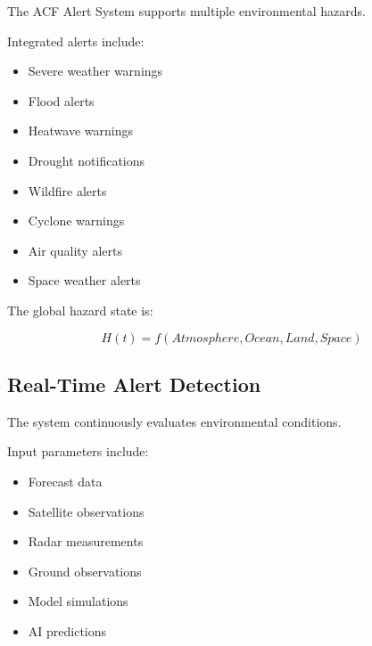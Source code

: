 The ACF Alert System supports multiple environmental hazards.

Integrated alerts include:

\begin{itemize}

\item Severe weather warnings

\item Flood alerts

\item Heatwave warnings

\item Drought notifications

\item Wildfire alerts

\item Cyclone warnings

\item Air quality alerts

\item Space weather alerts

\end{itemize}


The global hazard state is:

\[
H(t)=
f(Atmosphere,Ocean,Land,Space)
\]



\subsection{Real-Time Alert Detection}

The system continuously evaluates environmental conditions.

Input parameters include:

\begin{itemize}

\item Forecast data

\item Satellite observations

\item Radar measurements

\item Ground observations

\item Model simulations

\item AI predictions

\end{itemize}


